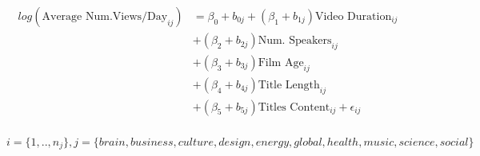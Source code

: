 \begin{align}
\begin{split}
log(\text{Average Num.Views/Day}_{ij})&=\beta_0+b_{0j}+(\beta_1+b_{1j})\text{Video Duration}_{ij}\\
&+(\beta_2+b_{2j})\text{Num. Speakers}_{ij}\\
&+(\beta_3+b_{3j})\text{Film Age}_{ij}\\
&+(\beta_4+b_{4j})\text{Title Length}_{ij}\\
&+(\beta_5+b_{5j})\text{Titles Content}_{ij}+\epsilon_{ij}\\
\end{split}
\label{poisson_mixed_themes_eqn}
\end{align}

\begin{equation*}
i=\{1,..,n_j\}, j=\{brain, business, culture, design, energy, global, health, music, science, social\}
\end{equation*}